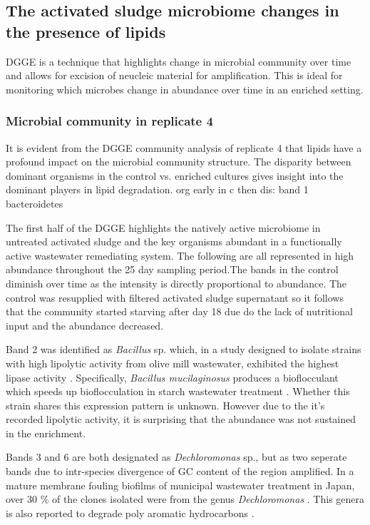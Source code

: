 \documentclass[11pt]{article}
\begin{document}
\subsection{The activated sludge microbiome changes in the presence of lipids}
DGGE is a technique that highlights change in microbial community over time and allows for excision of neucleic material for amplification. This is ideal for monitoring which microbes change in abundance over time in an enriched setting.

\subsubsection{Microbial community in replicate 4}
It is evident from the DGGE community analysis of replicate 4 that lipids have a profound impact on the microbial community structure. The disparity between dominant organisms in the control vs. enriched cultures gives insight into the dominant players in lipid degradation. 
org early in c then dis:
band 1 bacteroidetes

The first half of the DGGE highlights the natively active microbiome in untreated activated sludge and the key organisms abundant in a functionally active wastewater remediating system. The following are all represented in high abundance throughout the 25 day sampling period.The bands in the control diminish over time as the intensity is directly proportional to abundance. The control was resupplied with filtered activated sludge supernatant so it follows that the community started starving after day 18 due do the lack of nutritional input and the abundance decreased.

Band 2 was identified as \emph{Bacillus} sp. which, in a study designed to isolate strains with high lipolytic activity from olive mill wastewater, exhibited the highest lipase activity \cite{ertuugrul2007isolation}. Specifically, \emph{Bacillus mucilaginosus} produces a bioflocculant which speeds up bioflocculation in starch wastewater treatment \cite{deng2003characteristics}. Whether this strain shares this expression pattern is unknown. However due to the it's recorded lipolytic activity, it is surprising that the abundance was not sustained in the enrichment.

Bands 3 and 6 are both designated as \emph{Dechloromonas} sp., but as two seperate bands due to intr-species divergence of GC content of the region amplified. In a mature membrane fouling biofilms of municipal wastewater treatment in Japan, over 30 \% of the clones isolated were from the genus \emph{Dechloromonas} \cite{miura2007membrane}. This genera is also reported to degrade poly aromatic hydrocarbons \cite{oshiki2008pha}.
\end{document}
